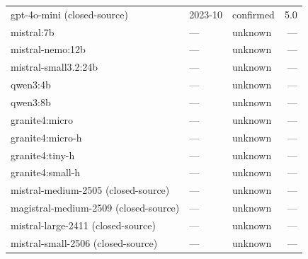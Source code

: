 \documentclass[12pt,letterpaper]{article}
\renewenvironment{table*}{\begin{table}}{\end{table}}
\begin{document}
\begin{table}[!htbp]
\begin{tabularx}{\linewidth}{X l l r}
gpt-4o-mini (closed-source) & 2023-10 & confirmed & 5.0 \\
mistral:7b & --- & unknown & --- \\
mistral-nemo:12b & --- & unknown & --- \\
mistral-small3.2:24b & --- & unknown & --- \\
qwen3:4b & --- & unknown & --- \\
qwen3:8b & --- & unknown & --- \\
granite4:micro & --- & unknown & --- \\
granite4:micro-h & --- & unknown & --- \\
granite4:tiny-h & --- & unknown & --- \\
granite4:small-h & --- & unknown & --- \\
mistral-medium-2505 (closed-source) & --- & unknown & --- \\
magistral-medium-2509 (closed-source) & --- & unknown & --- \\
mistral-large-2411 (closed-source) & --- & unknown & --- \\
mistral-small-2506 (closed-source) & --- & unknown & --- \\
\bottomrule
\end{tabularx}
\end{table}
\end{document}

